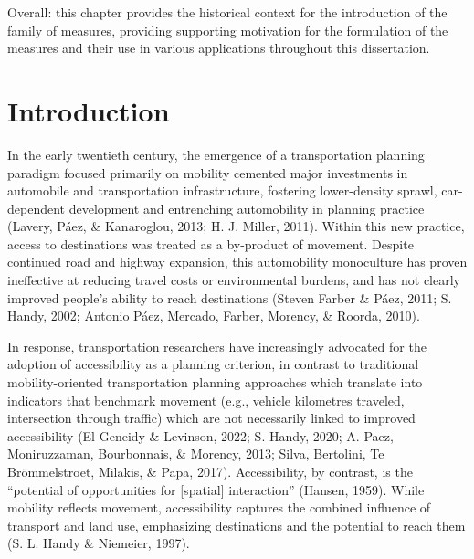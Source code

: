 \documentclass[
11pt, %
oneside, %
english, %
singlespacing, %
]{macthesis} %
\begin{document}
Overall: this chapter provides the historical context for the introduction of the family of measures, providing supporting motivation for the formulation of the measures and their use in various applications throughout this dissertation.

\section{Introduction}\label{introduction}

In the early twentieth century, the emergence of a transportation planning paradigm focused primarily on mobility cemented major investments in automobile and transportation infrastructure, fostering lower-density sprawl, car-dependent development and entrenching automobility in planning practice (Lavery, Páez, \& Kanaroglou, 2013; H. J. Miller, 2011). Within this new practice, access to destinations was treated as a by-product of movement. Despite continued road and highway expansion, this automobility monoculture has proven ineffective at reducing travel costs or environmental burdens, and has not clearly improved people's ability to reach destinations (Steven Farber \& Páez, 2011; S. Handy, 2002; Antonio Páez, Mercado, Farber, Morency, \& Roorda, 2010).

In response, transportation researchers have increasingly advocated for the adoption of accessibility as a planning criterion, in contrast to traditional mobility-oriented transportation planning approaches which translate into indicators that benchmark movement (e.g., vehicle kilometres traveled, intersection through traffic) which are not necessarily linked to improved accessibility (El-Geneidy \& Levinson, 2022; S. Handy, 2020; A. Paez, Moniruzzaman, Bourbonnais, \& Morency, 2013; Silva, Bertolini, Te Brömmelstroet, Milakis, \& Papa, 2017). Accessibility, by contrast, is the ``potential of opportunities for {[}spatial{]} interaction'' (Hansen, 1959). While mobility reflects movement, accessibility captures the combined influence of transport and land use, emphasizing destinations and the potential to reach them (S. L. Handy \& Niemeier, 1997).
\end{document}

